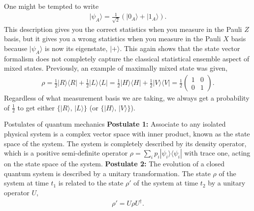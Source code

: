 \documentclass{beamer}
\begin{document}
\begin{frame}
\justify
One might be tempted to write
\begin{align}
|\psi_A\rangle = \frac{1}{\sqrt{2}} (|0_A\rangle + |1_A\rangle).
\end{align}
\vfill
This description gives you the correct statistics when you measure in the Pauli $Z$ basis, but it gives you a wrong statistics when you measure in the Pauli $X$ basis because $|\psi_A\rangle$ is now its eigenstate, $|+\rangle$.
\vfill
This again shows that the state vector formalism does not completely capture the classical statistical ensemble aspect of mixed states.
\vfill
Previously, an example of maximally mixed state was given,
\begin{align}
\rho = \frac{1}{2}|R\rangle \langle R| + \frac{1}{2}|L\rangle \langle L| = \frac{1}{2}|H\rangle \langle H| + \frac{1}{2}|V\rangle \langle V| = \frac{1}{2} \begin{pmatrix} 1 & 0 \\ 0 & 1 \end{pmatrix}.
\end{align}
\vfill
Regardless of what measurement basis we are taking, we always get a probability of $\frac{1}{2}$ to get either $\{|R\rangle,\, |L\rangle\}$ (or $\{|H\rangle,\, |V\rangle\}$).
\end{frame}

\begin{frame}{Postulates of quantum mechanics}
\justify
\textbf{Postulate 1:} Associate to any isolated physical system is a complex vector space with inner product, known as the state space of the system. The system is completely described by its density operator, which is a positive semi-definite operator $\rho = \sum_i p_i |\psi_i\rangle \langle\psi_i|$ with trace one, acting on the state space of the system.
\vfill
\textbf{Postulate 2:} The evolution of a closed quantum system is described by a unitary transformation. The state $\rho$ of the system at time $t_1$ is related to the state $\rho'$ of the system at time $t_2$ by a unitary operator $U$,
\begin{align}
\rho' = U\rho U^\dagger.
\end{align}
\end{frame}
\end{document}
